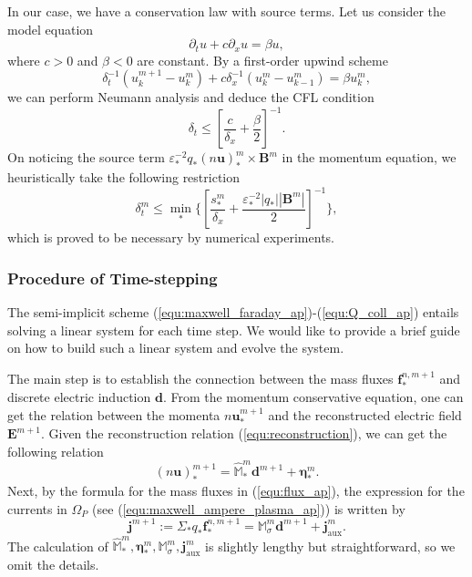 \documentclass{article}
\begin{document}
In our case, we have a conservation law with source terms. Let us consider the model equation
\begin{equation*}
    \partial_tu + c\partial_xu = \beta u, 
\end{equation*}
where $c>0$ and $\beta<0$ are constant. By a first-order upwind scheme
\begin{equation*}
    \delta_t^{-1}(u^{m+1}_k - u^m_k) + c\delta_x^{-1}(u^m_k - u^m_{k-1}) = \beta u^m_k,
\end{equation*}
we can perform Neumann analysis and deduce the CFL condition
\begin{equation*}
    \delta_t \leq \left[\frac{c}{\delta_x} + \frac{\beta}{2}\right]^{-1}.
\end{equation*}
On noticing the source term $\varepsilon_*^{-2}q_*(n\mathbf{u})^m_*\times\mathbf{B}^m$ in the momentum equation, we heuristically take the following restriction
\begin{equation*}
    \delta_t^m \leq \min_*\bigg\{\left[\frac{s^m_*}{\delta_x} + \frac{\varepsilon^{-2}_*|q_*||\mathbf{B}^m|}{2}\right]^{-1}\bigg\},
\end{equation*}
which is proved to be necessary by numerical experiments.

\subsubsection{Procedure of Time-stepping}
The semi-implicit scheme (\ref{equ:maxwell_faraday_ap})-(\ref{equ:Q_coll_ap}) entails solving a linear system for each time step. We would like to provide a brief guide on how to build such a linear system and evolve the system. 

The main step is to establish the connection between the mass fluxes $\mathbf{f}^{n,m+1}_*$ and discrete electric induction $\mathbf{d}$. From the momentum conservative equation, one can get the relation between the momenta $n\mathbf{u}^{m+1}_*$ and the reconstructed electric field $\mathbf{E}^{m+1}$. Given the reconstruction relation (\ref{equ:reconstruction}), we can get the following relation
\begin{equation*}
    (n\mathbf{u})_*^{m+1} = \hat{\mathbb{M}}^m_* \mathbf{d}^{m+1} + \bm{\eta}_*^m. 
\end{equation*}
Next, by the formula for the mass fluxes in (\ref{equ:flux_ap}), the expression for the currents in $\Omega_P$ (see (\ref{equ:maxwell_ampere_plasma_ap})) is written by 
\begin{equation} \label{equ:discrete_ohm}
    \mathbf{j}^{m+1} := \Sigma_\ast q_\ast \bm{f}^{n,m+1}_\ast = \mathbb{M}_\sigma^{m} \mathbf{d}^{m+1} + \mathbf{j}^m_{\text{aux}}.
\end{equation}
The calculation of $\hat{\mathbb{M}}_*^m, \bm{\eta}_*^m, \mathbb{M}_\sigma^m, \mathbf{j}^m_{\text{aux}}$ is slightly lengthy but straightforward, so we omit the details. 
\end{document}
